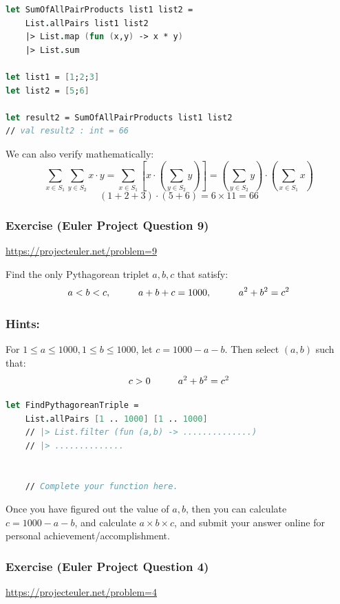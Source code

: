 \documentclass[12pt]{article}
\begin{document}
\begin{lstlisting}[language=FSharp]
let SumOfAllPairProducts list1 list2 =
    List.allPairs list1 list2
    |> List.map (fun (x,y) -> x * y)
    |> List.sum

let list1 = [1;2;3]
let list2 = [5;6]

let result2 = SumOfAllPairProducts list1 list2 
// val result2 : int = 66
\end{lstlisting}
We can also verify mathematically:
\[
\sum_{x \in S_1} \sum_{y \in S_2} x \cdot y = \sum_{x \in S_1} \left[x \cdot \left( \sum_{y \in S_2} y \right) \right] = \left(\sum_{y \in S_2} y \right) \cdot \left(\sum_{x \in S_1} x\right)
\]
\[
(1 + 2 + 3) \cdot (5 + 6) = 6 \times 11 = 66
\]
\subsubsection*{Exercise (Euler Project Question 9)}
\url{https://projecteuler.net/problem=9}

Find the only Pythagorean triplet $a, b, c$ that satisfy:
\[
a < b < c, \hspace{1.0cm} a + b + c = 1000, \hspace{1.0cm} a^2 + b^2 = c^2
\]
\subsubsection*{Hints:} 
For $1 \leq a \leq 1000, 1 \leq b \leq 1000$, let  $c = 1000 - a - b$. Then select $(a,b)$ such that:
\[
c > 0 \hspace{1.0cm}a^2 + b^2 = c^2
\]
\begin{lstlisting}[language=FSharp]
let FindPythagoreanTriple =
    List.allPairs [1 .. 1000] [1 .. 1000]
    // |> List.filter (fun (a,b) -> ..............)
    // |> ..............


    // Complete your function here.

\end{lstlisting}
Once you have figured out the value of $a, b$, then you can calculate $c = 1000 - a - b$, and calculate $a \times b \times c$, and submit your answer online for personal achievement/accomplishment.

\pagebreak

\subsubsection*{Exercise  (Euler Project Question 4)}
\url{https://projecteuler.net/problem=4}
\end{document}
